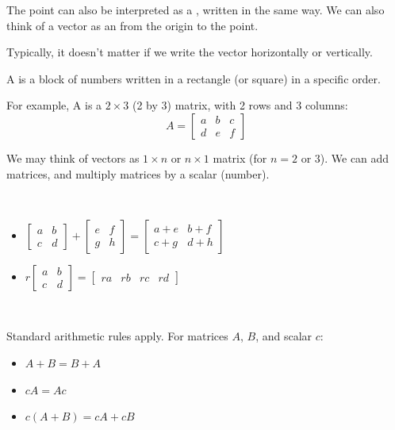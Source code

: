 \documentclass[11pt,fleqn]{book} %
\begin{document}
The point can also be interpreted as a , written in the same way. We can also think of a vector as an  from the origin to the point.

Typically, it doesn't matter if we write the vector horizontally or vertically.

\begin{definition}[Matrix]
    A  is a block of numbers written in a rectangle (or square) in a specific order.
\end{definition}

For example, A is a $2 \times 3$ (2 by 3) matrix, with 2 rows and 3 columns: $$A = \begin{bmatrix} a & b & c \\ d & e & f \end{bmatrix}$$

We may think of vectors as $1 \times n$ or $n \times 1$ matrix (for $n = 2$ or $3$). We can add matrices, and multiply matrices by a scalar (number).

{~~~}

\begin{itemize}
    \item $\begin{bmatrix} a & b \\ c & d \end{bmatrix} + \begin{bmatrix} e & f \\ g & h \end{bmatrix} = \begin{bmatrix} a + e & b + f \\ c + g & d + h \end{bmatrix}$
    \item $r\begin{bmatrix} a & b \\ c & d \end{bmatrix} = \begin{bmatrix} ra & rb & rc & rd \end{bmatrix}$
\end{itemize}

{~~~}

Standard arithmetic rules apply. For matrices $A$, $B$, and scalar $c$:

\begin{itemize}
    \item $A + B = B + A$
    \item $cA = Ac$
    \item $c(A + B) = cA + cB$
\end{itemize}
\end{document}
